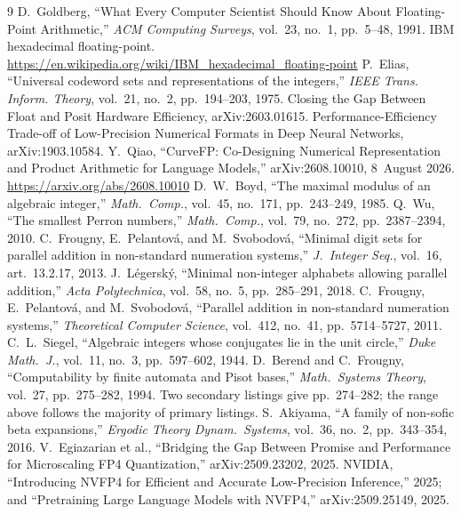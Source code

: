 \documentclass[11pt]{article}
\theoremstyle{definition}
\begin{document}
\begin{thebibliography}{9}
 D.~Goldberg, ``What Every Computer Scientist Should Know About Floating-Point Arithmetic,'' \emph{ACM Computing Surveys}, vol.~23, no.~1, pp.~5--48, 1991.
 IBM hexadecimal floating-point. \url{https://en.wikipedia.org/wiki/IBM_hexadecimal_floating-point}
 P.~Elias, ``Universal codeword sets and representations of the integers,'' \emph{IEEE Trans. Inform. Theory}, vol.~21, no.~2, pp.~194--203, 1975.
 Closing the Gap Between Float and Posit Hardware Efficiency, arXiv:2603.01615.
 Performance-Efficiency Trade-off of Low-Precision Numerical Formats in Deep Neural Networks, arXiv:1903.10584.
 Y.~Qiao, ``CurveFP: Co-Designing Numerical Representation and Product Arithmetic for Language Models,'' arXiv:2608.10010, 8~August 2026. \url{https://arxiv.org/abs/2608.10010}
 D.~W.~Boyd, ``The maximal modulus of an algebraic integer,''
\emph{Math.\ Comp.}, vol.~45, no.~171, pp.~243--249, 1985.
 Q.~Wu, ``The smallest Perron numbers,'' \emph{Math.\ Comp.},
vol.~79, no.~272, pp.~2387--2394, 2010.
 C.~Frougny, E.~Pelantov\'a, and M.~Svobodov\'a,
``Minimal digit sets for parallel addition in non-standard numeration systems,''
\emph{J.\ Integer Seq.}, vol.~16, art.~13.2.17, 2013.
 J.~L\'egersk\'y, ``Minimal non-integer alphabets
allowing parallel addition,'' \emph{Acta Polytechnica}, vol.~58, no.~5,
pp.~285--291, 2018.
 C.~Frougny, E.~Pelantov\'a, and M.~Svobodov\'a,
``Parallel addition in non-standard numeration systems,'' \emph{Theoretical
Computer Science}, vol.~412, no.~41, pp.~5714--5727, 2011.
 C.~L.~Siegel, ``Algebraic integers whose conjugates lie in
the unit circle,'' \emph{Duke Math.\ J.}, vol.~11, no.~3, pp.~597--602, 1944.
 D.~Berend and C.~Frougny, ``Computability by finite automata
and Pisot bases,'' \emph{Math.\ Systems Theory}, vol.~27, pp.~275--282, 1994.
Two secondary listings give pp.~274--282; the range above follows the majority of
primary listings.
 S.~Akiyama, ``A family of non-sofic beta expansions,''
\emph{Ergodic Theory Dynam.\ Systems}, vol.~36, no.~2, pp.~343--354, 2016.
 V.~Egiazarian et al., ``Bridging the Gap Between Promise and
Performance for Microscaling FP4 Quantization,'' arXiv:2509.23202, 2025.
 NVIDIA, ``Introducing NVFP4 for Efficient and Accurate
Low-Precision Inference,'' 2025; and ``Pretraining Large Language Models with
NVFP4,'' arXiv:2509.25149, 2025.

\end{thebibliography}
\end{document}
